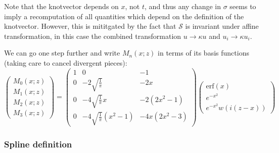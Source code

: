 \documentclass[a4paper,10pt,twosided]{article}
\begin{document}
Note that the knotvector depends on $x$, not $t$, and thus any change in $\sigma$ seems to imply a recomputation 
of all quantities which depend on the definition of the knotvector. However, this is mititgated by the fact that 
$\mathcal{S}$ is invariant under affine transformation, in this case the combined transformation $u \rightarrow \kappa u$ and $u_i \rightarrow \kappa u_i $.

We can go one step further and write $M_n(x;z)$ in terms of its basis functions (taking
care to cancel divergent pieces):
\begin{equation}
     \left( \begin{array}{c} M_0(x;z) \\ M_1(x;z) \\ M_2(x;z) \\ M_3(x;z) \end{array} \right)
     = \left( \begin{array}{ccc}
          1 &  0 & -1
     \\   0 & -2\sqrt{\frac{1}{\pi}}& -2x 
     \\   0 & -4\sqrt{\frac{1}{\pi}}x& -2(2x^2-1) 
     \\   0 & -4\sqrt{\frac{1}{\pi}}(x^2-1)& -4x(2x^2-3) 
       \end{array}\right) 
       \left(\begin{array}{c} 
                      \mathrm{erf}\left(x\right)
              \\      e^{-x^2}
              \\      e^{-x^2}w\left(i(z-x) \right)
             \end{array} \right)
\end{equation}

\subsubsection{Spline definition}
\end{document}
